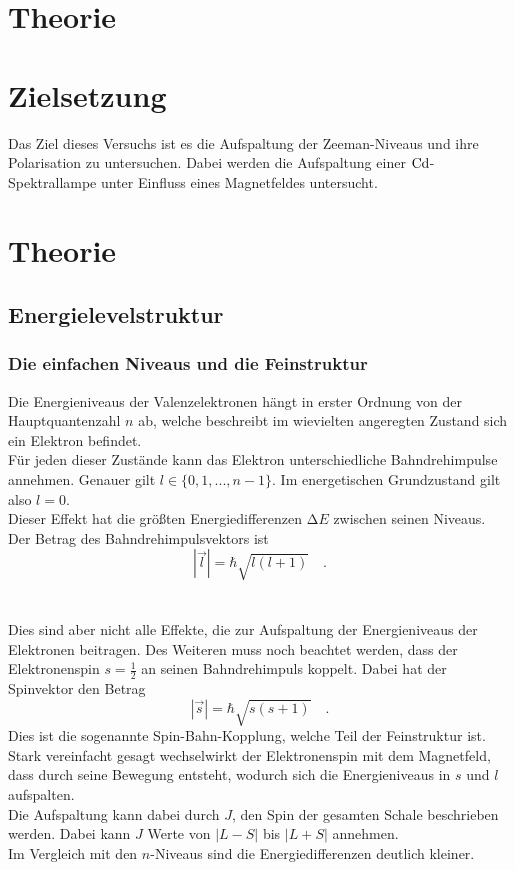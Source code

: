 \section{Theorie}

\section{Zielsetzung}
    Das Ziel dieses Versuchs ist es die Aufspaltung der Zeeman-Niveaus und ihre Polarisation zu untersuchen.
    Dabei werden die Aufspaltung einer $\ce{Cd}$-Spektrallampe unter Einfluss eines Magnetfeldes untersucht.
\section{Theorie}

\subsection{Energielevelstruktur}


\subsubsection{Die einfachen Niveaus und die Feinstruktur}

\noindent
Die Energieniveaus der Valenzelektronen hängt in erster Ordnung von der Hauptquantenzahl $n$ ab, 
welche beschreibt im wievielten angeregten Zustand sich ein Elektron befindet.\\
Für jeden dieser Zustände kann das Elektron unterschiedliche Bahndrehimpulse annehmen. Genauer gilt $l \in \{0,1, ..., n-1\}$. Im energetischen Grundzustand gilt also $l = 0$.\\
Dieser Effekt hat die größten Energiedifferenzen $\increment E$ zwischen seinen Niveaus.
Der Betrag des Bahndrehimpulsvektors ist
\begin{equation*}
    |\vec{l}| = \hbar \sqrt{l(l+1)} \quad .
\end{equation*}\\\\
Dies sind aber nicht alle Effekte, die zur Aufspaltung der Energieniveaus der Elektronen beitragen.
Des Weiteren muss noch beachtet werden, dass der Elektronenspin $s =\frac{1}{2}$ an seinen Bahndrehimpuls koppelt.
Dabei hat der Spinvektor den Betrag 
\begin{equation*}
    |\vec{s}| = \hbar \sqrt{s(s+1)} \quad .
\end{equation*}
Dies ist die sogenannte Spin-Bahn-Kopplung, welche Teil der Feinstruktur ist. \\
Stark vereinfacht gesagt wechselwirkt der Elektronenspin mit dem Magnetfeld, dass durch seine Bewegung entsteht, wodurch sich die Energieniveaus in $s$ und $l$ aufspalten.\\
Die Aufspaltung kann dabei durch $J$, den Spin der gesamten Schale beschrieben werden. Dabei kann $J$ Werte von $\bigl| L - S \bigr|$ bis $\bigl| L + S \bigr|$ annehmen.\\
Im Vergleich mit den $n$-Niveaus sind die Energiedifferenzen deutlich kleiner.\\\\

